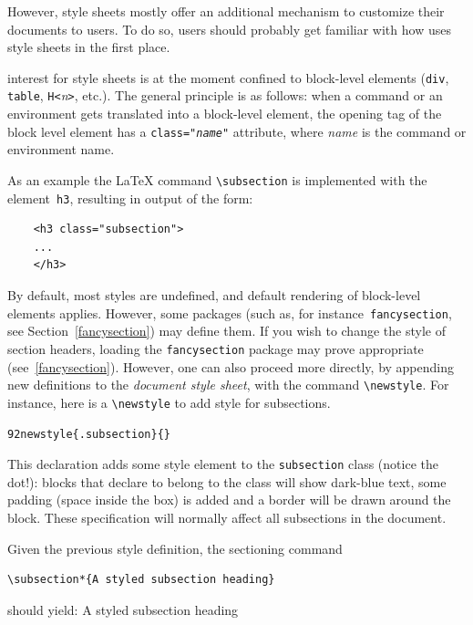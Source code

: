 However, style sheets mostly offer an additional mechanism to
customize their documents to \hevea{} users. To do so, users should
probably get familiar with how \hevea{} uses style sheets in the first
place.

\hevea{} interest for style sheets is at the moment confined to
block-level elements (\verb+div+, \verb+table+, \verb+H<+\textit{n}\verb+>+,
etc.).
The general principle is as follows: when a command or an
environment gets translated into a block-level element,
the opening tag of the block level element has a
\texttt{class="\textit{name}"} attribute, where \textit{name} is the
command or environment name.

As an example the \LaTeX{} command \verb+\subsection+
 is implemented with the element~\verb+h3+, resulting in
\html{} output of the form:
\begin{verbatim}
    <h3 class="subsection">
    ...
    </h3>
\end{verbatim}
By default, most styles are undefined, and default rendering of
block-level elements applies. However, some packages (such as, for
instance~\texttt{fancysection}, see Section~\ref{fancysection}) may
define them.
%
If you wish to change the style of section headers, loading the
\texttt{fancysection} package may prove appropriate (see~\ref{fancysection}).
However, one can also proceed more directly, by appending new
definitions to the \emph{document style
sheet}, with the command \verb+\newstyle+.
For instance, here is a \verb+\newstyle+ to add style for subsections.
\begin{alltt}
  \char92newstyle\{.subsection\}\{\stylex\}
\end{alltt}
This declaration adds some style element to the
\texttt{subsection} class (notice the dot!):
blocks that declare to belong to the class
will show dark-blue text, some padding
(space inside the box) is added and a border will be drawn around the block.
These specification will normally affect all subsections in the document.
\begin{htmlonly}
Given the previous style definition, the sectioning command
\begin{verbatim}
\subsection*{A styled subsection heading}
\end{verbatim}
should yield:
A styled subsection heading
\end{htmlonly}


